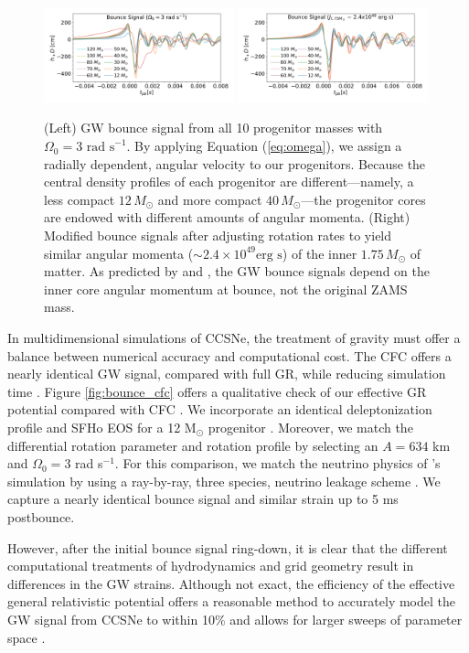 \documentclass[twocolumn,times]{aastex62}  %
\newcommand{\Msun}{\ensuremath{\mathrm{M}_\odot}\xspace}
\begin{document}
\begin{figure}[t]
  \centering     %
  \includegraphics[width=0.49\textwidth]{hd3_bounce_test.pdf}
  \includegraphics[width=0.49\textwidth]{hdj_bounce_final.pdf}
  \caption{(Left) GW bounce signal from all 10 progenitor masses with $\Omega_0 = 3 \text{ rad s}^{-1}$.  By applying Equation (\ref{eq:omega}), we assign a radially dependent, angular velocity to our progenitors.  Because the central density profiles of each progenitor are different---namely, a less compact $12\,M_\odot$ and more compact $40\,M_\odot$---the progenitor cores are endowed with different amounts of angular momenta.   (Right) Modified bounce signals after adjusting rotation rates to yield similar angular momenta ($\sim 2.4\times10^{49} \text{erg s}$) of the inner $1.75\,M_\odot$ of matter.  As predicted by \citet{dimm:2008} and \citet{abdik:2010,abdik:2014}, the GW bounce signals depend on the inner core angular momentum at bounce, not the original ZAMS mass.}
  \label{fig:bounce}
\end{figure}

In multidimensional simulations of CCSNe, the treatment of gravity must offer a balance between numerical accuracy and computational cost.   The CFC offers a nearly identical GW signal, compared with full GR, while reducing simulation time \citep{ott:2007}.  Figure \ref{fig:bounce_cfc} offers a qualitative check of our effective GR potential compared with CFC \citep{richers:2017}.  We incorporate an identical deleptonization profile \citep{lieb:2005} and SFHo EOS \citep{steiner:2013} for a 12 \Msun progenitor \citep{woosley:2007}.  Moreover, we match the differential rotation parameter and rotation profile by selecting an $A = 634$ km and $\Omega_0 = 3$ rad s$^{-1}$.  For this comparison, we match the neutrino physics of \citet{richers:2017}'s simulation by using a ray-by-ray, three species, neutrino leakage scheme \citep{oconnor:2010,couch:2014}.  We capture a nearly identical bounce signal and similar strain up to 5 ms postbounce. \par
However, after the initial bounce signal ring-down, it is clear that the different computational treatments of hydrodynamics and grid geometry result in differences in the GW strains.  Although not exact, the efficiency of the effective general relativistic potential offers a reasonable method to accurately model the GW signal from CCSNe to within 10\% and allows for larger sweeps of parameter space \citep{muller:2013}.
\end{document}
